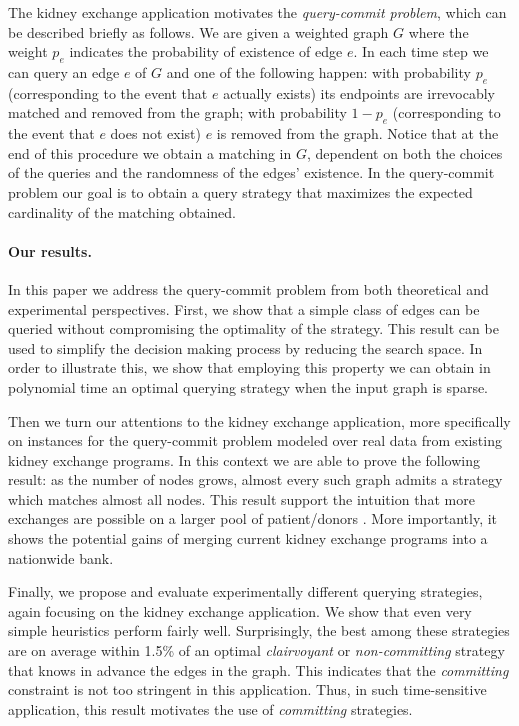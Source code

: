 \documentclass[12pt]{article}
\begin{document}
	The kidney exchange application motivates the \emph{query-commit problem}, which can be described briefly as follows. We are given a weighted graph $G$ where the weight $p_e$ indicates the probability of existence of edge $e$. In each time step we can query an edge $e$ of $G$ and one of the following happen: with probability $p_e$ (corresponding to the event that $e$ actually exists) its endpoints are irrevocably matched and removed from the graph; with probability $1- p_e$ (corresponding to the event that $e$ does not exist) $e$ is removed from the graph. Notice that at the end of this procedure we obtain a matching in $G$, dependent on both the choices of the queries and the randomness of the edges' existence. In the query-commit problem our goal is to obtain a query strategy that maximizes the expected cardinality of the matching obtained. 
		
		\paragraph{Our results.} 	In this paper we address the query-commit problem from both theoretical and experimental perspectives. First, we show that a simple class of edges can be queried without compromising the optimality of the strategy. This result can be used to simplify the decision making process by reducing the search space. In order to illustrate this, we show that employing this property we can obtain in polynomial time an optimal querying strategy when the input graph is sparse. 
		
		Then we turn our attentions to the kidney exchange application, more specifically on instances for the query-commit problem modeled over real data from existing kidney exchange programs. In this context we are able to prove the following result: as the number of nodes grows, almost every such graph admits a strategy which matches almost all nodes. This result support the intuition that more exchanges are possible on a larger pool of patient/donors \cite{david, segev}. More importantly, it shows the potential gains of merging current kidney exchange programs into a nationwide bank.
		
		Finally, we propose and evaluate experimentally different querying strategies, again focusing on the kidney exchange application. We show that even very simple heuristics perform fairly well. Surprisingly, the best among these strategies are on average within 1.5\% of an optimal \emph{clairvoyant} or \emph{non-committing} strategy that knows in advance the edges in the graph. This indicates that the \emph{committing} constraint is not too stringent in this application. Thus, in such time-sensitive application, this result motivates the use of \emph{committing} strategies.
				
\end{document}
